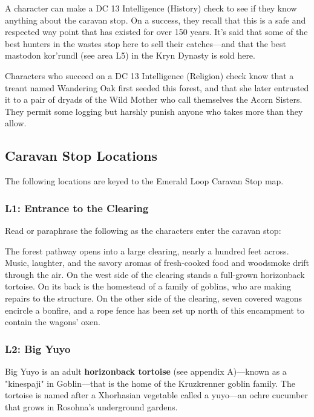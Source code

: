 \documentclass[10pt,a4paper,twoside,bg=print,twocolumn,openany,nodeprecatedcode]{dndbook}
\begin{document}
A character can make a DC 13 Intelligence (History) check to see if they know anything about the caravan stop. On a success, they recall that this is a safe and respected way point that has existed for over 150 years. It's said that some of the best hunters in the wastes stop here to sell their catches—and that the best mastodon kor'rundl (see area L5) in the Kryn Dynasty is sold here.

Characters who succeed on a DC 13 Intelligence (Religion) check know that a treant named Wandering Oak first seeded this forest, and that she later entrusted it to a pair of dryads of the Wild Mother who call themselves the Acorn Sisters. They permit some logging but harshly punish anyone who takes more than they allow.

\subsection{Caravan Stop Locations}
The following locations are keyed to the Emerald Loop Caravan Stop map.

\subsubsection{L1: Entrance to the Clearing}
Read or paraphrase the following as the characters enter the caravan stop:

\begin{DndReadAloud}{}
The forest pathway opens into a large clearing, nearly a hundred feet across. Music, laughter, and the savory aromas of fresh-cooked food and woodsmoke drift through the air. On the west side of the clearing stands a full-grown horizonback tortoise. On its back is the homestead of a family of goblins, who are making repairs to the structure. On the other side of the clearing, seven covered wagons encircle a bonfire, and a rope fence has been set up north of this encampment to contain the wagons' oxen.

\end{DndReadAloud}

\subsubsection{L2: Big Yuyo}
Big Yuyo is an adult \textbf{horizonback tortoise} (see appendix A)—known as a "kinespaji" in Goblin—that is the home of the Kruzkrenner goblin family. The tortoise is named after a Xhorhasian vegetable called a yuyo—an ochre cucumber that grows in Rosohna's underground gardens.
\end{document}
